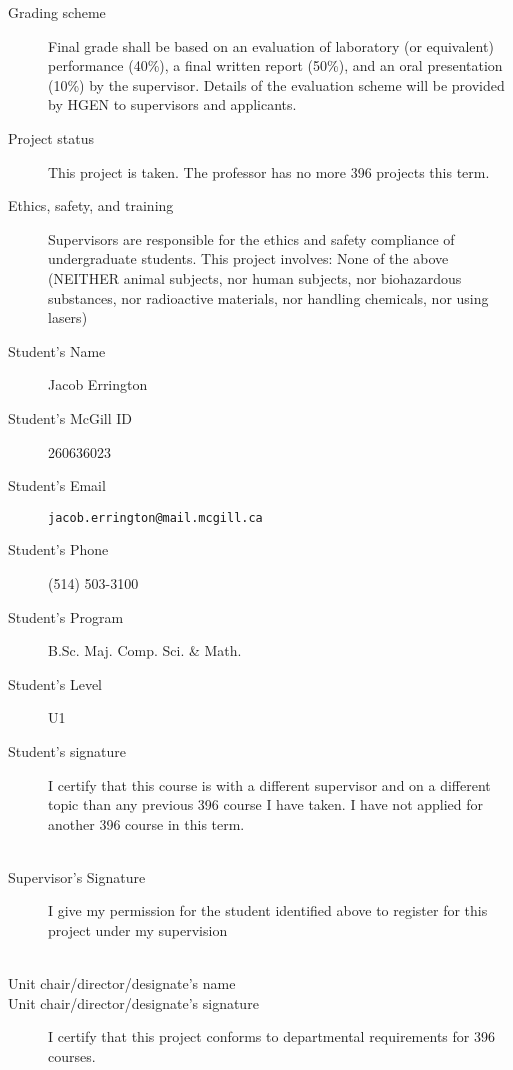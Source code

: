\documentclass[12pt]{article}
\begin{document}
\begin{description}
    \item[Grading scheme] Final grade shall be based on an evaluation of laboratory (or equivalent) performance (40\%), a final written report (50\%), and an oral presentation (10\%) by the supervisor. Details of the evaluation scheme will be provided by HGEN to supervisors and applicants.
    \item[Project status] This project is taken. The professor has no more 396 projects this term.
    \item[Ethics, safety, and training] Supervisors are responsible for the ethics and safety compliance of undergraduate students.  This project involves: None of the above (NEITHER animal subjects, nor human subjects, nor biohazardous substances, nor radioactive materials, nor handling chemicals, nor using lasers)
    \item[Student's Name] Jacob Errington
    \item[Student's McGill ID] 260636023
    \item[Student's Email] \texttt{jacob.errington@mail.mcgill.ca}
    \item[Student's Phone] (514) 503-3100
    \item[Student's Program] B.Sc. Maj. Comp. Sci. \& Math.
    \item[Student's Level] U1
    \item[Student's signature] 

    I certify that this course is with a different supervisor and on a different topic than any previous 396 course I have taken. I have not applied for another 396 course in this term. \\ \\

    \item[Supervisor's Signature] I give my permission for the student identified above to register for this project under my supervision \\ \\

    \item[Unit chair/director/designate's name]
    \item[Unit chair/director/designate's signature] 
    
    I certify that this project conforms to departmental requirements for 396 courses. \\ \\
\end{description}
\end{document}
